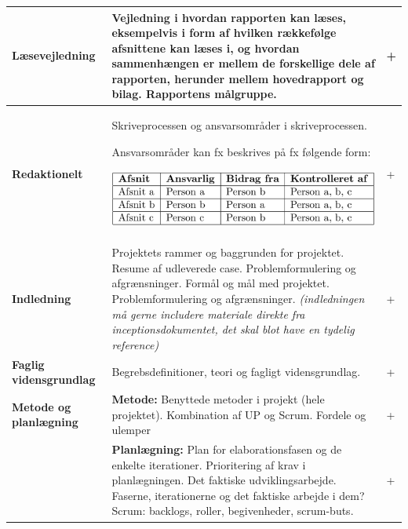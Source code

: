 \begin{longtable}{|p{30mm}|p{90mm}|p{25mm}|}
\textbf{Læsevejledning}     & Vejledning i hvordan rapporten kan læses, eksempelvis i form af hvilken rækkefølge afsnittene kan læses i, og hvordan sammenhængen er mellem de forskellige dele af rapporten, herunder mellem hovedrapport og bilag. Rapportens målgruppe.
                                &   +     \\ \hline

\textbf{Redaktionelt}   & Skriveprocessen og ansvarsområder i skriveprocessen.

Ansvarsområder kan fx beskrives på fx følgende form:

\includegraphics[scale=0.49]{images/kontolskema_bilag_F.png}

                                &   +        \\ \hline
                                
\textbf{Indledning}     & Projektets rammer og baggrunden for projektet.
Resume af udleverede case.
Problemformulering og afgrænsninger. 
Formål og mål med projektet.
Problemformulering og afgrænsninger. 
\textit{(indledningen må gerne includere materiale direkte fra inceptionsdokumentet, det skal blot have en tydelig reference)}
                                &   +         \\ \hline
                                
\textbf{Faglig vidensgrundlag}  & Begrebsdefinitioner, teori og  fagligt vidensgrundlag.
                                &    +        \\ \hline
                                
\textbf{Metode og planlægning} & \textbf{Metode:} 
Benyttede metoder i projekt (hele projektet).
Kombination af UP og Scrum. Fordele og ulemper
                                &   +         \\ \hline
                                
                            & \textbf{Planlægning:} 
Plan for elaborationsfasen og de enkelte iterationer. Prioritering af krav i planlægningen.
Det faktiske udviklingsarbejde. Faserne, iterationerne og det faktiske  arbejde i dem?
Scrum: backlogs, roller, begivenheder, scrum-buts.
                                &    +        \\ \hline


\end{longtable}

